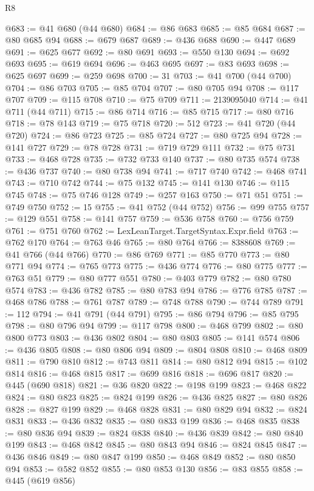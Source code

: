 \begin{lexlean}{R8}
\begin{coremodule}
@683 := @41 @680 (@44 @680)
@684 := @86 @683
@685 := @85 @684
@687 := @80 @685 @94
@688 := @679 @687
@689 := @436 @688
@690 := @447 @689
@691 := @625 @677
@692 := @80 @691
@693 := @550 @130
@694 := @692 @693
@695 := @619 @694
@696 := @463 @695
@697 := @83 @693
@698 := @625 @697
@699 := @259 @698
@700 := 31
@703 := @41 @700 (@44 @700)
@704 := @86 @703
@705 := @85 @704
@707 := @80 @705 @94
@708 := @117 @707
@709 := @115 @708
@710 := @75 @709
@711 := 2139095040
@714 := @41 @711 (@44 @711)
@715 := @86 @714
@716 := @85 @715
@717 := @80 @716
@718 := @78 @143
@719 := @75 @718
@720 := 512
@723 := @41 @720 (@44 @720)
@724 := @86 @723
@725 := @85 @724
@727 := @80 @725 @94
@728 := @141 @727
@729 := @78 @728
@731 := @719 @729 @111
@732 := @75 @731
@733 := @468 @728
@735 := @732 @733 @140
@737 := @80 @735 @574
@738 := @436 @737
@740 := @80 @738 @94
@741 := @717 @740
@742 := @468 @741
@743 := @710 @742
@744 := @75 @132
@745 := @141 @130
@746 := @115 @745
@748 := @75 @746 @128
@749 := @257 @163
@750 := @71 @51
@751 := @749 @750
@752 := 15
@755 := @41 @752 (@44 @752)
@756 := @99 @755
@757 := @129 @551
@758 := @141 @757
@759 := @536 @758
@760 := @756 @759
@761 := @751 @760
@762 := LexLeanTarget.TargetSyntax.Expr.field
@763 := @762 @170
@764 := @763 @46
@765 := @80 @764
@766 := 8388608
@769 := @41 @766 (@44 @766)
@770 := @86 @769
@771 := @85 @770
@773 := @80 @771 @94
@774 := @765 @773
@775 := @436 @774
@776 := @80 @775
@777 := @763 @51
@779 := @80 @777 @551
@780 := @403 @779
@782 := @80 @780 @574
@783 := @436 @782
@785 := @80 @783 @94
@786 := @776 @785
@787 := @468 @786
@788 := @761 @787
@789 := @748 @788
@790 := @744 @789
@791 := 112
@794 := @41 @791 (@44 @791)
@795 := @86 @794
@796 := @85 @795
@798 := @80 @796 @94
@799 := @117 @798
@800 := @468 @799
@802 := @80 @800 @773
@803 := @436 @802
@804 := @80 @803
@805 := @141 @574
@806 := @436 @805
@808 := @80 @806 @94
@809 := @804 @808
@810 := @468 @809
@811 := @790 @810
@812 := @743 @811
@814 := @80 @812 @94
@815 := @102 @814
@816 := @468 @815
@817 := @699 @816
@818 := @696 @817
@820 := @445 (@690 @818)
@821 := @36 @820
@822 := @198 @199
@823 := @468 @822
@824 := @80 @823
@825 := @824 @199
@826 := @436 @825
@827 := @80 @826
@828 := @827 @199
@829 := @468 @828
@831 := @80 @829 @94
@832 := @824 @831
@833 := @436 @832
@835 := @80 @833 @199
@836 := @468 @835
@838 := @80 @836 @94
@839 := @824 @838
@840 := @436 @839
@842 := @80 @840 @199
@843 := @468 @842
@845 := @80 @843 @94
@846 := @824 @845
@847 := @436 @846
@849 := @80 @847 @199
@850 := @468 @849
@852 := @80 @850 @94
@853 := @582 @852
@855 := @80 @853 @130
@856 := @83 @855
@858 := @445 (@619 @856)

\end{coremodule}
\end{lexlean}
